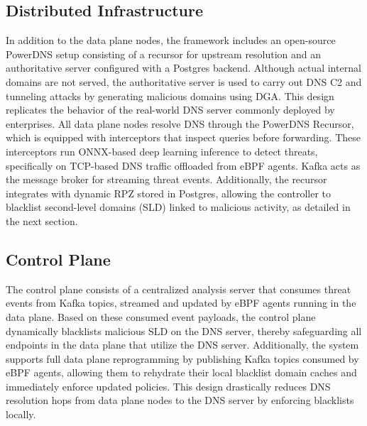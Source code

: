 \documentclass [11pt, proquest] {uwthesis}[2020/02/24]
\begin{document}
\subsection{Distributed Infrastructure}
In addition to the data plane nodes, the framework includes an open-source PowerDNS setup consisting of a recursor for upstream resolution and an authoritative server configured with a Postgres backend. Although actual internal domains are not served, the authoritative server is used to carry out DNS C2 and tunneling attacks by generating malicious domains using DGA. This design replicates the behavior of the real-world DNS server commonly deployed by enterprises.
All data plane nodes resolve DNS through the PowerDNS Recursor, which is equipped with interceptors that inspect queries before forwarding. These interceptors run ONNX-based deep learning inference to detect threats, specifically on TCP-based DNS traffic offloaded from eBPF agents. Kafka acts as the message broker for streaming threat events. Additionally, the recursor integrates with dynamic RPZ stored in Postgres, allowing the controller to blacklist second-level domains (SLD) linked to malicious activity, as detailed in the next section.

\subsection{Control Plane}
The control plane consists of a centralized analysis server that consumes threat events from Kafka topics, streamed and updated by eBPF agents running in the data plane. Based on these consumed event payloads, the control plane dynamically blacklists malicious SLD on the DNS server, thereby safeguarding all endpoints in the data plane that utilize the DNS server. Additionally, the system supports full data plane reprogramming by publishing Kafka topics consumed by eBPF agents, allowing them to rehydrate their local blacklist domain caches and immediately enforce updated policies. This design drastically reduces DNS resolution hops from data plane nodes to the DNS server by enforcing blacklists locally.
\end{document}
